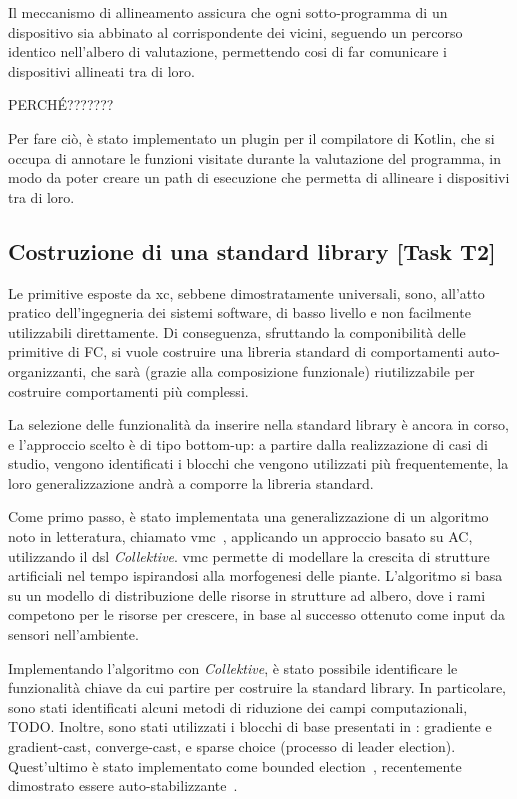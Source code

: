 \documentclass[13pt, a4paper]{article}
\newcommand{\ck}{\emph{Collektive}}
\begin{document}
Il meccanismo di allineamento assicura che ogni sotto-programma di un dispositivo sia abbinato al corrispondente dei vicini,
    seguendo un percorso identico nell'albero di valutazione,
    permettendo cosi di far comunicare i dispositivi allineati tra di loro.

PERCHÉ???????

Per fare ciò, è stato implementato un plugin per il compilatore di Kotlin, che si occupa di annotare le funzioni visitate
    durante la valutazione del programma, in modo da poter creare un path di esecuzione che permetta di allineare i dispositivi
    tra di loro.

\subsection{Costruzione di una standard library [Task T2]}\label{subsec:task-t2-[costruzione-di-una-standard-library]}

Le primitive esposte da \ac{xc}, sebbene dimostratamente universali,
sono, all'atto pratico dell'ingegneria dei sistemi software,
di basso livello e non facilmente utilizzabili direttamente.
%
Di conseguenza, sfruttando la componibilità delle primitive di \ac{FC},
si vuole costruire una libreria standard di comportamenti auto-organizzanti,
che sarà (grazie alla composizione funzionale) riutilizzabile per costruire comportamenti più complessi.

La selezione delle funzionalità da inserire nella standard library
è ancora in corso,
e l'approccio scelto è di tipo bottom-up:
a partire dalla realizzazione di casi di studio,
vengono identificati i blocchi che vengono utilizzati più frequentemente,
la loro generalizzazione andrà a comporre la libreria standard.

Come primo passo,
è stato implementata una generalizzazione di un algoritmo noto in letteratura,
chiamato \ac{vmc}~\cite{ZahadatHS17},
applicando un approccio basato su \ac{AC}, utilizzando il \ac{dsl} \ck{}.
%
\ac{vmc} permette di modellare la crescita di strutture artificiali nel tempo ispirandosi alla morfogenesi delle piante.
%
L'algoritmo si basa su un modello di distribuzione delle risorse in strutture ad albero,
    dove i rami competono per le risorse per crescere, in base al successo ottenuto come input da sensori nell'ambiente.

Implementando l'algoritmo con \ck{},
è stato possibile identificare le funzionalità chiave da cui partire per costruire la standard library.
%
In particolare,
sono stati identificati alcuni metodi di riduzione dei campi computazionali, TODO.
%
Inoltre, sono stati utilizzati i blocchi di base presentati in \cite{TOMACS}:
gradiente e gradient-cast, converge-cast, e sparse choice (processo di leader election).
%
Quest'ultimo è stato implementato come bounded election~\cite{ACSOS},
recentemente dimostrato essere auto-stabilizzante~\cite{Dijkstra}.
\end{document}
